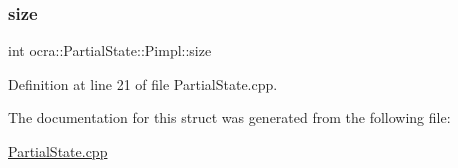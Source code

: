 \subsubsection{\texorpdfstring{size}{size}}
{\footnotesize\ttfamily int ocra\+::\+Partial\+State\+::\+Pimpl\+::size}



Definition at line 21 of file Partial\+State.\+cpp.



The documentation for this struct was generated from the following file\+:\begin{DoxyCompactItemize}
\item 
\hyperlink{PartialState_8cpp}{Partial\+State.\+cpp}\end{DoxyCompactItemize}
